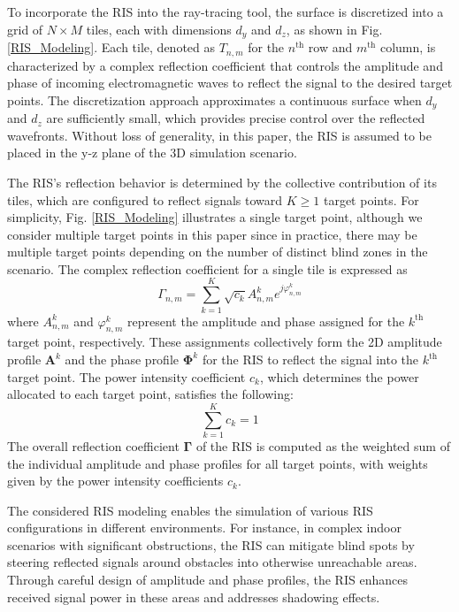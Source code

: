 \documentclass{IEEEoj}
\begin{document}
To incorporate the RIS into the ray-tracing tool, the surface is discretized into a grid of $N \times M$ tiles, each with dimensions $d_y$ and $d_z$, as shown in Fig. \ref{RIS_Modeling}. Each tile, denoted as $T_{n,m}$ for the $n^{\text{th}}$ row and $m^{\text{th}}$ column, is characterized by a complex reflection coefficient that controls the amplitude and phase of incoming electromagnetic waves to reflect the signal to the desired target points. The discretization approach approximates a continuous surface when $d_y$ and $d_z$ are sufficiently small, which provides precise control over the reflected wavefronts. Without loss of generality, in this paper, the RIS is assumed to be placed in the y-z plane of the 3D simulation scenario.

The RIS's reflection behavior is determined by the collective contribution of its tiles, which are configured to reflect signals toward $K \geq 1$ target points. For simplicity, Fig. \ref{RIS_Modeling} illustrates a single target point, although we consider multiple target points in this paper since in practice, there may be multiple target points depending on the number of distinct blind zones in the scenario. The complex reflection coefficient for a single tile is expressed as
\begin{equation} \label{ref_coef_exp}
	\Gamma_{n,m} = \sum \limits_{k=1}^K \sqrt{c_k} A_{n,m}^k e^{j \varphi_{n,m}^k}
\end{equation}
where $A_{n,m}^k$ and $\varphi_{n,m}^k$ represent the amplitude and phase assigned for the $k^{\text{th}}$ target point, respectively. These assignments collectively form the 2D amplitude profile $\mathbf{A}^k$ and the phase profile $\mathbf{\Phi}^k$ for the RIS to reflect the signal into the $k^{\text{th}}$ target point. The power intensity coefficient $c_k$, which determines the power allocated to each target point, satisfies the following:
\begin{equation}
	\sum_{k=1}^K c_k = 1
\end{equation}
The overall reflection coefficient $\mathbf{\Gamma}$ of the RIS is computed as the weighted sum of the individual amplitude and phase profiles for all target points, with weights given by the power intensity coefficients $c_k$.

The considered RIS modeling enables the simulation of various RIS configurations in different environments. For instance, in complex indoor scenarios with significant obstructions, the RIS can mitigate blind spots by steering reflected signals around obstacles into otherwise unreachable areas. Through careful design of amplitude and phase profiles, the RIS enhances received signal power in these areas and addresses shadowing effects.
\end{document}
